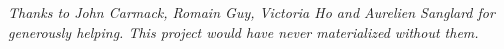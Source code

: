 \clearpage
\thispagestyle{empty}
\vspace*{\fill}
\begin{center}
\begin{minipage}{.6\textwidth}
\emph{Thanks to John Carmack, Romain Guy, Victoria Ho and Aurelien Sanglard for generously helping. This project would have never
materialized without them.\\}
\end{minipage}
\end{center}
\vfill
\clearpage
